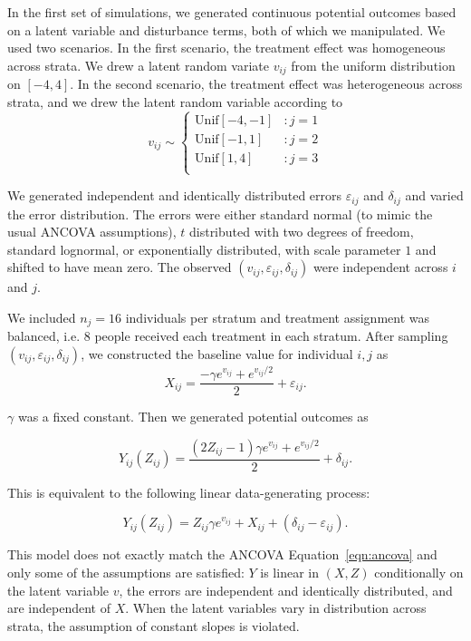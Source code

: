 \documentclass[12pt]{article}
\begin{document}
In the first set of simulations, we generated continuous potential outcomes based on a latent variable and disturbance terms, both of which we manipulated.
We used two scenarios.
In the first scenario, the treatment effect was homogeneous across strata.
We drew a latent random variate $v_{ij}$ from the uniform distribution on $[-4, 4]$.
In the second scenario, the treatment effect was heterogeneous across strata, and we drew the latent random variable according to
\begin{displaymath}
   v_{ij} \sim \left\{
     \begin{array}{lr}
       \text{Unif}[-4, -1] & : j=1\\
       \text{Unif}[-1, 1] & : j=2\\
       \text{Unif}[1, 4] & : j=3\\
     \end{array}
   \right.
\end{displaymath} 

We generated independent and identically distributed errors $\varepsilon_{ij}$ and $\delta_{ij}$ and varied the error distribution. 
The errors were either standard normal (to mimic the usual ANCOVA assumptions),
$t$ distributed with two degrees of freedom,
standard lognormal,
or exponentially distributed, with scale parameter $1$ and shifted to have mean zero.
The observed $(v_{ij}, \varepsilon_{ij}, \delta_{ij})$ were independent across $i$ and $j$.

We included $n_j=16$ individuals per stratum and treatment assignment was balanced, i.e. 8 people received each treatment in each stratum.
After sampling $(v_{ij}, \varepsilon_{ij}, \delta_{ij})$, we constructed the baseline value for individual $i,j$ as 
$$ X_{ij} = \frac{-\gamma e^{v_{ij}} + e^{v_{ij}/2}}{2} + \varepsilon_{ij}.$$

\noindent $\gamma$ was a fixed constant.
Then we generated potential outcomes as

$$Y_{ij}(Z_{ij}) = \frac{(2Z_{ij} - 1)\gamma e^{v_{ij}} + e^{v_{ij}/2}}{2} + \delta_{ij}.$$


\noindent This is equivalent to the following linear data-generating process:

$$Y_{ij}(Z_{ij}) = Z_{ij} \gamma e^{v_{ij}} + X_{ij} + (\delta_{ij} - \varepsilon_{ij}).$$

\noindent This model does not exactly match the ANCOVA Equation~\ref{eqn:ancova} and only some of the assumptions are satisfied:
$Y$ is linear in $(X, Z)$ conditionally on the latent variable $v$, 
the errors are independent and identically distributed, and are independent of $X$.
When the latent variables vary in distribution across strata, the assumption of constant slopes is violated.
\end{document}
